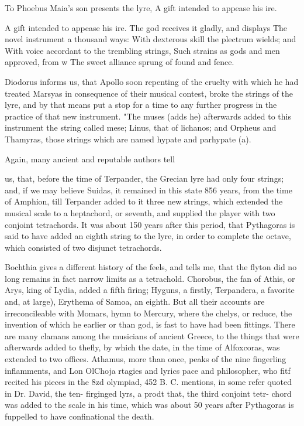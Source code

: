 \documentclass{article}
\begin{document}
To Phoebus Maia's son presents the lyre,
A gift intended to appease his ire.

A gift intended to appease his ire.
The god receives it gladly, and displays
The novel instrument a thousand ways:
With dexterous skill the plectrum wields; and
With voice accordant to the trembling strings,
Such strains as gods and men approved, from w
The sweet alliance sprung of found and fence.

Diodorus informs us, that Apollo soon repenting of the cruelty with which he had treated Marsyas in consequence of their musical contest, broke the strings of the lyre, and by that means put a stop for a time to any further progress in the practice of that new instrument. "The muses (adds he) afterwards added to this instrument the string called mese; Linus, that of lichanos; and Orpheus and Thamyras, those strings which are named hypate and parhypate (a).

Again, many ancient and reputable authors tell

us, that, before the time of Terpander, the Grecian lyre had only four strings; and, if we may believe Suidas, it remained in this state 856 years, from the time of Amphion, till Terpander added to it three new strings, which extended the musical scale to a heptachord, or seventh, and supplied the player with two conjoint tetrachords. It was about 150 years after this period, that Pythagoras is said to have added an eighth string to the lyre, in order to complete the octave, which consisted of two disjunct tetrachords.

Bochthia gives a different history of the feels, and tells me, that the flyton did no long remains in fact narrow limits as a tetrachold. Chorobus, the fan of Athis, or Arys, king of Lydia, added a fifth firing; Hyguns, a firstly, Terpandera, a favorite and, at large), Erythema of Samoa, an eighth. But all their accounts are irreconcileable with Momars, hymn to Mercury, where the chelys, or reduce, the invention of which he earlier or than god, is fast to have had been fittings. There are many clamans among the musicians of ancient Greece, to the things that were afterwards added to thefly, by which the date, in the time of Alfoxcoras, was extended to two offices. Athamus, more than once, peaks of the nine fingerling inflamments, and Lon OlChoja rtagies and lyrics pace and philosopher, who fitf recited his pieces in the 8zd olympiad, 452 B. C. mentions, in some refer quoted in Dr. David, the ten- firginged lyrs, a prodt that, the third conjoint tetr- chord was added to the scale in his time, which was about 50 years after Pythagoras is fuppelled to have confinational the death.
\end{document}

